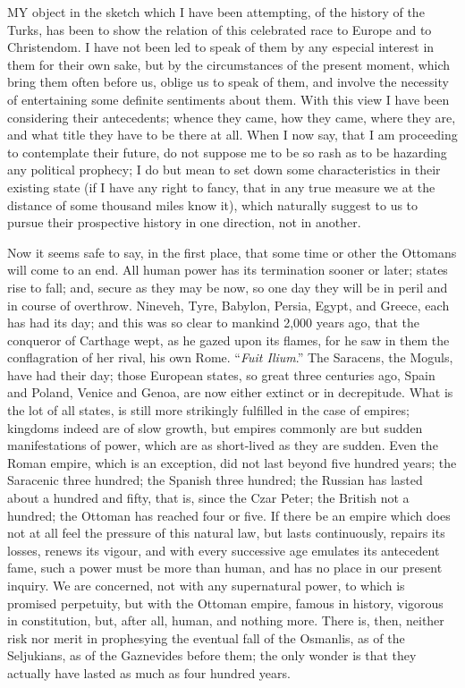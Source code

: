 MY
object in the sketch which I have been attempting, of the history of
the Turks, has been to show the relation of this celebrated race to
Europe and to Christendom. I have not been led to speak of them by any
especial interest in them for their own sake, but by the circumstances
of the present moment, which bring them often before us, oblige us to
speak of them, and involve the necessity of entertaining some definite
sentiments about them. With this view I have been considering their
antecedents; whence they came, how they came, where they are, and what
title they have to be there at all. When I now say, that I am
proceeding to contemplate their future, do not suppose me to be so
rash as to be hazarding any political prophecy; I do but mean to set
down some characteristics in their existing state (if I have any right
to fancy, that in any true measure we at the distance of some thousand
miles know it), which naturally suggest to us to pursue their
prospective history in one direction, not in another.

Now it seems safe to say, in
the first place, that some time or other the Ottomans will come to an
end. All human power has its termination sooner or later; states
rise to fall; and, secure as they may be now, so one day they will be
in peril and in course of overthrow. Nineveh, Tyre, Babylon, Persia,
Egypt, and Greece, each has had its day; and this was so clear to
mankind 2,000 years ago, that the conqueror of Carthage wept, as he
gazed upon its flames, for he saw in them the conflagration of her
rival, his own Rome. ``\emph{Fuit Ilium}.'' The Saracens, the Moguls,
have had their day; those European states, so great three centuries
ago, Spain and Poland, Venice and Genoa, are now either extinct or in
decrepitude. What is the lot of all states, is still more strikingly
fulfilled in the case of empires; kingdoms indeed are of slow growth,
but empires commonly are but sudden manifestations of power, which are
as short-lived as they are sudden. Even the Roman empire, which is an
exception, did not last beyond five hundred years; the Saracenic three
hundred; the Spanish three hundred; the Russian has lasted about a
hundred and fifty, that is, since the Czar Peter; the British not a
hundred; the Ottoman has reached four or five. If there be an empire
which does not at all feel the pressure of this natural law, but lasts
continuously, repairs its losses, renews its vigour, and with every
successive age emulates its antecedent fame, such a power must be more
than human, and has no place in our present inquiry. We are concerned,
not with any supernatural power, to which is promised perpetuity, but
with the Ottoman empire, famous in history, vigorous in constitution,
but, after all, human, and nothing more. There is, then, neither risk
nor merit in prophesying the eventual fall of the Osmanlis, as of the
Seljukians, as of the Gaznevides before them; the only wonder is that
they actually have lasted as much as four hundred years.

